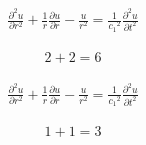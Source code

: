 \documentclass{article}
\makeatletter
\newcommand{\leqnomode}{\tagsleft@true}
\newcommand{\reqnomode}{\tagsleft@false}
\makeatother
\begin{document}
\reqnomode
\begin{align}
\frac{{{\partial ^2}u}}{{\partial {r^2}}} + \frac{1}{r}\frac{{\partial u}}{{\partial r}} - \frac{u}{{{r^2}}} = \frac{1}{{{c_1}^2}}\frac{{{\partial ^2}u}}{{\partial {t^2}}}
\end{align}

\begin{align}
  2+2=6
\end{align}


\leqnomode
\begin{align}
\frac{{{\partial ^2}u}}{{\partial {r^2}}} + \frac{1}{r}\frac{{\partial u}}{{\partial r}} - \frac{u}{{{r^2}}} = \frac{1}{{{c_1}^2}}\frac{{{\partial ^2}u}}{{\partial {t^2}}}
\end{align}

\begin{align}
  1+1=3
\end{align}
\end{document}
